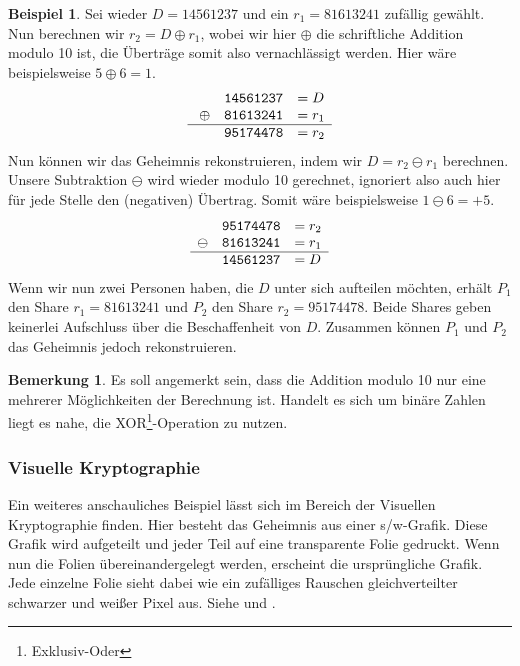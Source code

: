 \documentclass[12pt, a4paper, oneside, titlepage]{report}
\theoremstyle{definition}
\newtheorem{bem}[lemma]{Bemerkung}
\newtheorem{bsp}[lemma]{Beispiel}
\begin{document}
	\begin{bsp}
	Sei wieder $ D = 14561237 $ und ein $ r_1 = 81613241 $ zufällig gewählt. Nun berechnen wir $ r_2 = D \oplus r_1 $, wobei wir hier $ \oplus $ die schriftliche Addition modulo 10 ist, die Überträge somit also vernachlässigt werden. Hier wäre beispielsweise $ 5 \oplus 6 = 1 $.
	$$\begin{array}{ccl}
 	 & \mathtt{14561237} & = D \\\
	\oplus & \mathtt{81613241} & = r_1 \\\hline
 	 & \mathtt{95174478} & = r_2 
	\end{array}$$
	Nun können wir das Geheimnis rekonstruieren, indem wir $ D = r_2 \ominus r_1 $  berechnen. Unsere Subtraktion $ \ominus $ wird wieder modulo 10 gerechnet, ignoriert also auch hier für jede Stelle den (negativen) Übertrag. Somit wäre beispielsweise $ 1 \ominus 6 = + 5 $.
	$$\begin{array}{ccl}
	 & \mathtt{95174478} & = r_2 \\
	\ominus & \mathtt{81613241} & = r_1 \\\hline
	 & \mathtt{14561237} & = D
	\end{array}$$
	Wenn wir nun zwei Personen haben, die $ D $ unter sich aufteilen möchten, erhält $ P_1 $ den Share $ r_1 = 81613241 $ und $ P_2 $ den Share $ r_2 = 95174478$. Beide Shares geben keinerlei Aufschluss über die Beschaffenheit von $ D $. Zusammen können $ P_1 $ und $ P_2 $ das Geheimnis jedoch rekonstruieren.
	\end{bsp}

	\begin{bem}
		Es soll angemerkt sein, dass die Addition modulo 10 nur eine mehrerer Möglichkeiten der Berechnung ist. Handelt es sich um binäre Zahlen liegt es nahe, die XOR\footnote{Exklusiv-Oder}-Operation zu nutzen.
	\end{bem}
	
	\subsubsection{Visuelle Kryptographie}

	Ein weiteres anschauliches Beispiel lässt sich im Bereich der Visuellen Kryptographie finden. Hier besteht das Geheimnis aus einer s/w-Grafik. Diese Grafik wird aufgeteilt und jeder Teil auf eine transparente Folie gedruckt. Wenn nun die Folien übereinandergelegt werden, erscheint die ursprüngliche Grafik. Jede einzelne Folie sieht dabei wie ein zufälliges Rauschen gleichverteilter schwarzer und weißer Pixel aus. Siehe \cite{shamir_naor} und \cite{visual}.
	
\end{document}
